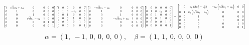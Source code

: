 \documentclass[11pt]{article}
\theoremstyle{definition}
\begin{document}
\[
\scaletoalign{\textwidth}{{\left[\begin{matrix}1 & \sqrt{d} u_{1} + u_{0} & 0 & 0 & 0 & 0\\0 & 1 & 0 & 0 & 0 & 0\\0 & 0 & 1 & 0 & 0 & 0\\0 & 0 & \sqrt{d} u_{1} - u_{0} & 1 & 0 & 0\\0 & 0 & 0 & 0 & 1 & 0\\0 & 0 & 0 & 0 & 0 & 1\end{matrix}\right]} {\left[\begin{matrix}1 & 0 & 0 & 0 & 0 & 0\\0 & 1 & 0 & - v_{0} & 0 & 0\\0 & 0 & 1 & 0 & 0 & 0\\0 & 0 & 0 & 1 & 0 & 0\\0 & 0 & 0 & 0 & 1 & 0\\0 & 0 & 0 & 0 & 0 & 1\end{matrix}\right]} {\left[\begin{matrix}1 & - \sqrt{d} u_{1} - u_{0} & 0 & 0 & 0 & 0\\0 & 1 & 0 & 0 & 0 & 0\\0 & 0 & 1 & 0 & 0 & 0\\0 & 0 & - \sqrt{d} u_{1} + u_{0} & 1 & 0 & 0\\0 & 0 & 0 & 0 & 1 & 0\\0 & 0 & 0 & 0 & 0 & 1\end{matrix}\right]} {\left[\begin{matrix}1 & 0 & 0 & 0 & 0 & 0\\0 & 1 & 0 & v_{0} & 0 & 0\\0 & 0 & 1 & 0 & 0 & 0\\0 & 0 & 0 & 1 & 0 & 0\\0 & 0 & 0 & 0 & 1 & 0\\0 & 0 & 0 & 0 & 0 & 1\end{matrix}\right]} = {\left[\begin{matrix}1 & 0 & v_{0} \left(d u_{1}^{2} - u_{0}^{2}\right) & - v_{0} \left(\sqrt{d} u_{1} + u_{0}\right) & 0 & 0\\0 & 1 & v_{0} \left(\sqrt{d} u_{1} - u_{0}\right) & 0 & 0 & 0\\0 & 0 & 1 & 0 & 0 & 0\\0 & 0 & 0 & 1 & 0 & 0\\0 & 0 & 0 & 0 & 1 & 0\\0 & 0 & 0 & 0 & 0 & 1\end{matrix}\right]}}
\]
\[
\alpha = \left( 1, \  -1, \  0, \  0, \  0, \  0\right), \quad \beta = \left( 1, \  1, \  0, \  0, \  0, \  0\right)
\]
\end{document}
